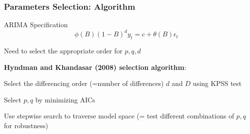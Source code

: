 \documentclass{beamer}
\newenvironment{wideitemize}{\itemize\addtolength{\itemsep}{10pt}}{\enditemize}
\begin{document}
\begin{frame}
  \frametitle{Parameters Selection: Algorithm}
  \begin{block}{ARIMA Specification}
    \begin{equation*}
    \phi(B) (1-B)^d y_t = c + \theta(B) \epsilon_t      
    \end{equation*}

    \begin{wideitemize}
      \item Need to select the appropriate order for $p, q, d$
    \end{wideitemize}
    
  \end{block}

\medskip
  
\textbf{Hyndman and Khandasar (2008) selection algorithm}:\\

\begin{wideitemize}
  \item Select the differencing order (=number of differences) \textbf{$d$} and \textbf{$D$} using KPSS test
  \item Select $p, q$ by minimizing AICs
  \item Use stepwise search to traverse model space (= test different combinations of $p, q$ for robustness)
\end{wideitemize}

\end{frame}
\end{document}
